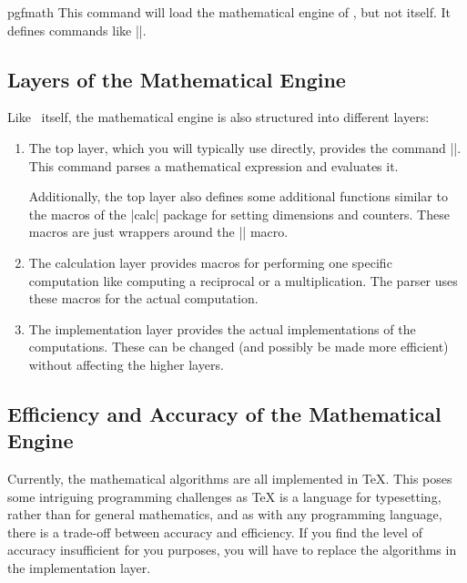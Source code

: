 \begin{package}{pgfmath}
	This command will load the mathematical engine of \pgfname, but not 
	\pgfname itself. It defines commands like |\pgfmathparse|.
\end{package}


\subsection{Layers of the Mathematical Engine}

Like \pgfname\ itself, the mathematical engine is also structured into
different layers:

\begin{enumerate}
\item 
	The top layer, which you will typically use directly, provides
  the command |\pgfmathparse|. This command parses a mathematical
  expression and evaluates it.

  Additionally, the top layer also defines some additional functions
  similar to the macros of the |calc| package for setting dimensions
  and counters. These macros are just wrappers around the
  |\pgfmathparse| macro.
  
\item 
	The calculation layer provides macros for performing one
  specific computation like computing a reciprocal or a
  multiplication. The parser uses these macros for the actual
  computation.
  
\item 
	The implementation layer provides the actual implementations of
  the computations. These can be changed (and possibly be made more
  efficient) without affecting the higher layers.
\end{enumerate}



\subsection{Efficiency and Accuracy of the Mathematical Engine}

Currently, the mathematical algorithms are all implemented in \TeX.
This poses some intriguing programming challenges as \TeX{} is a
language for typesetting, rather than for general mathematics,
and as with any programming language, there is a trade-off between 
accuracy and efficiency. 
If you find the level of accuracy insufficient for you
purposes, you will have to replace the algorithms in the
implementation layer.

